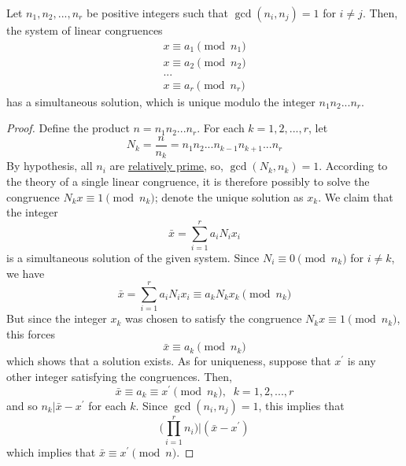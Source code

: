 \documentclass{article}
\newcounter{theorem}[section]
\begin{document}
\begin{theorem}
  \label{thm:chinese-remainder-theorem}
Let $n_1, n_2, ..., n_r$ be positive integers such that $\gcd(n_i, n_j) = 1$ for $i \neq j$. Then, the system of linear congruences 
\begin{align*}
    x \equiv a_1 \pmod{n_1} \\
    x \equiv a_2 \pmod{n_2} \\
    ... \\
    x \equiv a_r \pmod{n_r}
\end{align*}
has a simultaneous solution, which is unique modulo the integer $n_1 n_2 ... n_r$. 
\end{theorem}
\begin{proof}
Define the product $n = n_1 n_2 ... n_r$. For each $k = 1, 2, ..., r$, let
\begin{equation}
  N_k = \frac{n}{n_k} = n_1 n_2 ... n_{k-1} n_{k+1} ... n_r
\end{equation}
By hypothesis, all $n_i$ are \hyperref[def:relatively-prime]{relatively prime}, so, $\gcd(N_k, n_k) = 1$. According to the theory of a single linear congruence, it is therefore possibly to solve the congruence $N_k x \equiv 1 \pmod{n_k}$; denote the unique solution as $x_k$. We claim that the integer 
\begin{equation}
  \bar{x} = \sum_{i = 1}^r a_i N_i x_i
\end{equation}
is a simultaneous solution of the given system. Since $N_i \equiv 0 \pmod{n_k}$ for $i \neq k$, we have
\begin{equation}
  \bar{x} = \sum_{i=1}^r a_i N_i x_i \equiv a_k N_k x_k \pmod{n_k}
\end{equation}
But since the integer $x_k$ was chosen to satisfy the congruence $N_k x \equiv 1 \pmod{n_k}$, this forces
\begin{equation}
  \bar{x} \equiv a_k \pmod{n_k}
\end{equation}
which shows that a solution exists. As for uniqueness, suppose that $x^\prime$ is any other integer satisfying the congruences. Then, 
\begin{equation}
  \bar{x} \equiv a_k \equiv x^\prime \pmod{n_k}, \;\; k = 1, 2, ..., r
\end{equation}
and so $n_k | \bar{x} - x^\prime$ for each $k$. Since $\gcd(n_i, n_j) = 1$, this implies that 
\begin{equation}
  \Big( \prod_{i=1}^r n_i \Big) \bigg| (\bar{x} - x^\prime)
\end{equation}
which implies that $\bar{x} \equiv x^\prime \pmod{n}$. 
\end{proof}
\end{document}
